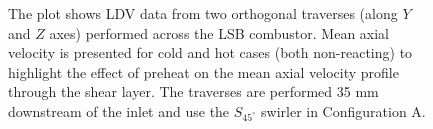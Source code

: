 \begin{figure}[h]

\centering



\caption[Effect of preheat temperature on the LSB flow field - III]{The plot shows LDV data from two orthogonal traverses (along \(Y\) and \(Z\) axes) performed across the LSB combustor. Mean axial velocity is presented for cold and hot cases (both non-reacting) to highlight the effect of preheat on the mean axial velocity profile through the shear layer. The traverses are performed 35 mm downstream of the inlet and use the \(S_{45^\circ}\) swirler in Configuration A.}

\label{fig:temperatureLDVTransverse2}

\end{figure}

